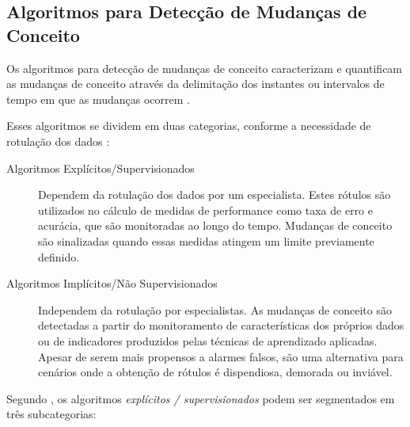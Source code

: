 \documentclass[msc, classic, a4paper]{ufbathesis}
\begin{document}

\subsection{Algoritmos para Detecção de Mudanças de Conceito}

Os algoritmos para detecção de mudanças de conceito caracterizam e quantificam as mudanças de conceito através da delimitação dos instantes ou intervalos de tempo em que as mudanças ocorrem \cite{Basseville:1993:DAC:151741}.

Esses algoritmos se dividem em duas categorias, conforme a necessidade de rotulação dos dados \cite{Zliobaite:2010}:

\begin{description}
    \item[Algoritmos Explícitos/Supervisionados] Dependem da rotulação dos dados por um especialista.
    Estes rótulos são utilizados no cálculo de medidas de performance como taxa de erro e acurácia, que são monitoradas ao longo do tempo.
    Mudanças de conceito são sinalizadas quando essas medidas atingem um limite previamente definido.

    \item[Algoritmos Implícitos/Não Supervisionados] Independem da rotulação por especialistas.
    As mudanças de conceito são detectadas a partir do monitoramento de características dos próprios dados ou de indicadores produzidos pelas técnicas de aprendizado aplicadas.
    Apesar de serem mais propensos a alarmes falsos, são uma alternativa para cenários onde a obtenção de rótulos é dispendiosa, demorada ou inviável.
\end{description}

Segundo , os algoritmos \textit{explícitos / supervisionados} podem ser segmentados em três subcategorias:
\end{document}
